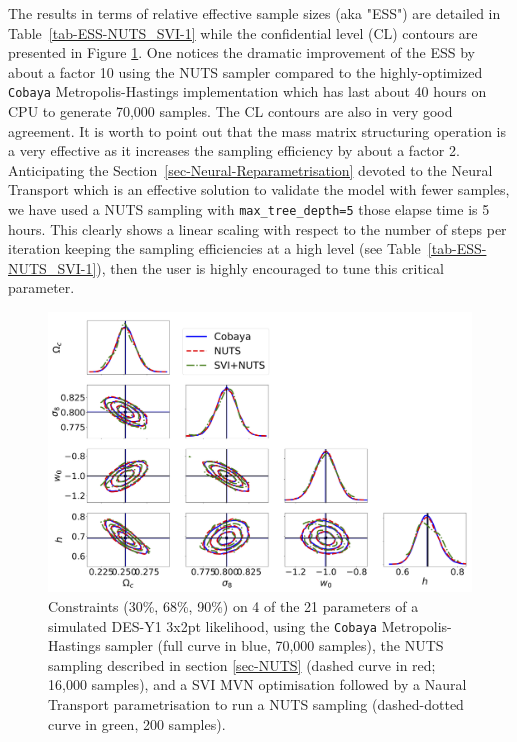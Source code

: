 \documentclass[twocolumn,twocolappendix,nofootinbib,iop]{openjournal}
\begin{document}
The results in terms of relative effective sample sizes (aka "ESS") are detailed in Table~\ref{tab-ESS-NUTS_SVI-1} while the confidential level (CL) contours are presented in Figure \ref{fig_cobaya_NUTS_SVI}. One notices the dramatic improvement of the ESS by about a factor 10 using the NUTS sampler compared to the highly-optimized \texttt{Cobaya}  Metropolis-Hastings implementation \citep{2019ascl.soft10019T,2021JCAP...05..057T} which has last about 40 hours on CPU to generate 70,000 samples. The CL contours are also in very good agreement. It is worth to point out that the mass matrix structuring operation is a very effective as it increases the sampling efficiency by about a factor 2.   Anticipating the Section~\ref{sec-Neural-Reparametrisation} devoted to the Neural Transport which is an effective solution to validate the model with fewer samples, we have used a NUTS sampling with \texttt{max\_tree\_depth=5} those elapse time is 5 hours. This clearly shows a linear scaling with respect to the number of steps per iteration keeping the sampling efficiencies at a high level (see Table~\ref{tab-ESS-NUTS_SVI-1}), then the user is highly encouraged to tune this critical parameter. 
%
\begin{figure}
\centering
\includegraphics[width=1.5\columnwidth]{figures/Cobaya-NUTS-SVI200.png}
\caption{Constraints (30\%, 68\%, 90\%) on 4 of the 21 parameters of a simulated DES-Y1 3x2pt likelihood, using the \texttt{Cobaya} Metropolis-Hastings sampler (full curve in blue, 70,000 samples), the  NUTS sampling described in section \ref{sec-NUTS} (dashed curve in red; 16,000 samples), and a SVI MVN optimisation followed by a Naural Transport parametrisation to run a NUTS sampling (dashed-dotted curve in green, 200 samples).}
\label{fig_cobaya_NUTS_SVI}
\end{figure}
\end{document}
